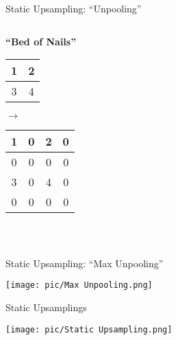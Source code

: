 \documentclass[serif, aspectratio=169]{beamer}
\begin{document}
\begin{frame}{Static Upsampling: ``Unpooling''}
\begin{columns}[c]
    \begin{column}{0.5\textwidth}
        \centering
        \textbf{``Bed of Nails''}\\
        \vspace{0.3cm}
        \begin{tabular}{|c|c|}
            \hline
            1 & 2 \\ \hline
            3 & 4 \\ \hline
        \end{tabular}
        \hspace{0.3cm} $\longrightarrow$ \hspace{0.3cm}
        \begin{tabular}{|c|c|c|c|}
            \hline
            1 & 0 & 2 & 0 \\ \hline
            0 & 0 & 0 & 0 \\ \hline
            3 & 0 & 4 & 0 \\ \hline
            0 & 0 & 0 & 0 \\ \hline
        \end{tabular}
        \vspace{0.3cm}\\
        \begin{flushleft}
        \end{flushleft}
    \end{column}
\end{columns}

\end{frame}



\begin{frame}{Static Upsampling: ``Max Unpooling''}
 
    \begin{center}
        \texttt{[image: pic/Max Unpooling.png]}
    \end{center}

\end{frame}


\begin{frame}{Static Upsamplings}
 
    \begin{center}
        \texttt{[image: pic/Static Upsampling.png]}
    \end{center}

\end{frame}
\end{document}
